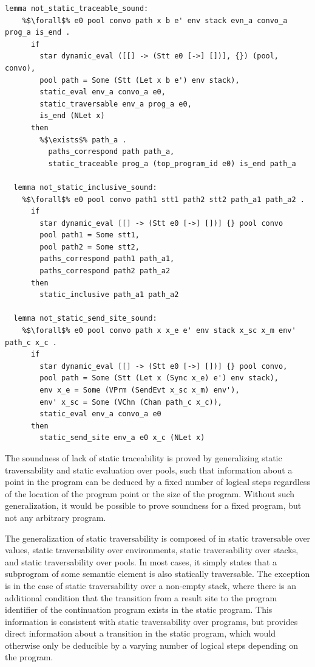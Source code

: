 \documentclass{article}
\begin{document}
\begin{lstlisting}[language=logic, escapechar=\%]
  lemma not_static_traceable_sound:
    %$\forall$% e0 pool convo path x b e' env stack evn_a convo_a prog_a is_end .
      if
        star dynamic_eval ([[] -> (Stt e0 [->] [])], {}) (pool, convo), 
        pool path = Some (Stt (Let x b e') env stack),
        static_eval env_a convo_a e0,
        static_traversable env_a prog_a e0,
        is_end (NLet x)
      then
        %$\exists$% path_a . 
          paths_correspond path path_a, 
          static_traceable prog_a (top_program_id e0) is_end path_a

  lemma not_static_inclusive_sound:
    %$\forall$% e0 pool convo path1 stt1 path2 stt2 path_a1 path_a2 . 
      if
        star dynamic_eval [[] -> (Stt e0 [->] [])] {} pool convo
        pool path1 = Some stt1, 
        pool path2 = Some stt2, 
        paths_correspond path1 path_a1, 
        paths_correspond path2 path_a2
      then
        static_inclusive path_a1 path_a2

  lemma not_static_send_site_sound:
    %$\forall$% e0 pool convo path x x_e e' env stack x_sc x_m env' path_c x_c .
      if
        star dynamic_eval [[] -> (Stt e0 [->] [])] {} pool convo, 
        pool path = Some (Stt (Let x (Sync x_e) e') env stack), 
        env x_e = Some (VPrm (SendEvt x_sc x_m) env'), 
        env' x_sc = Some (VChn (Chan path_c x_c)), 
        static_eval env_a convo_a e0
      then 
        static_send_site env_a e0 x_c (NLet x)
\end{lstlisting}

The soundness of lack of static traceability is proved by generalizing
static traversability and static evaluation over pools, such that information about a point in
the program can be deduced by a fixed number of logical steps regardless of the location of the
program point or the size of the program. Without such generalization, it would be possible to
prove soundness for a fixed program, but not any arbitrary program.

The generalization of static traversability is composed of in static traversable over values,
static traversability over environments, static traversability over stacks, and static
traversability over pools.
In most cases, it simply states that a subprogram of some semantic element is also statically
traversable. The exception is in the case of
static traversability over a non-empty stack, where
there is an additional condition that the transition
from a result site to the program identifier
of the continuation program exists in the static program.
This information is consistent with static
traversability over programs, but provides direct information about a transition in the
static program, which would otherwise only be deducible by a varying number of logical steps
depending on the program.
\end{document}
